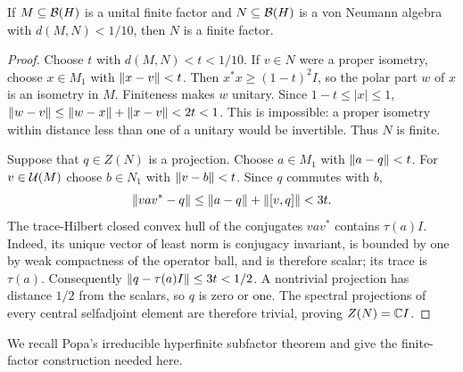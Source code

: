 \begin{lemma}
\label{lem:finite-neighbor}
If $M\subseteq\mathcal B(H)$ is a unital finite factor and $N\subseteq\mathcal B(H)$
is a von Neumann algebra with $d(M,N)<1/10$, then $N$ is a finite factor.
\end{lemma}
\begin{proof}
Choose $t$ with $d(M,N)<t<1/10$.  If $v\in N$ were a proper isometry,
choose $x\in M_1$ with $\lVert x-v\rVert<t$.  Then
$x^*x\ge(1-t)^2I$, so the polar part $w$ of $x$ is an isometry in $M$.
Finiteness makes $w$ unitary.  Since $1-t\le |x|\le1$,
$\lVert w-v\rVert\le\lVert w-x\rVert+\lVert x-v\rVert<2t<1$.
This is impossible: a proper isometry within distance less than one of a
unitary would be invertible.  Thus $N$ is finite.

Suppose that $q\in Z(N)$ is a projection.  Choose $a\in M_1$ with
$\lVert a-q\rVert<t$.  For $v\in\mathcal U(M)$ choose $b\in N_1$ with
$\lVert v-b\rVert<t$.  Since $q$ commutes with $b$,
\[
 \lVert vav^*-q\rVert\le\lVert a-q\rVert+\lVert[v,q]\rVert<3t.
\]
The trace-Hilbert closed convex hull of the conjugates $vav^*$ contains
$\tau(a)I$.  Indeed, its unique vector of least norm is conjugacy
invariant, is bounded by one by weak compactness of the operator ball,
and is therefore scalar; its trace is $\tau(a)$.  Consequently
$\lVert q-\tau(a)I\rVert\le3t<1/2$.  A nontrivial projection has distance
$1/2$ from the scalars, so $q$ is zero or one.  The spectral projections
of every central selfadjoint element are therefore trivial, proving
$Z(N)=\mathbb C I$.
\end{proof}

We recall Popa's irreducible hyperfinite subfactor theorem
\cite{Popa1981} and give the finite-factor construction needed here.

